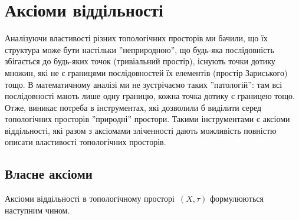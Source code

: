 \chapter{Аксіоми віддільності}

Аналізуючи властивості різних топологічних просторів ми бачили, що їх структура може бути настільки ''неприродною'', що будь-яка послідовність збігається до будь-яких точок (тривіальний простір), існують точки дотику множин, які не є границями послідовностей їх елементів (простір Зариського) тощо. В математичному аналізі ми не зустрічаємо таких ''патологій'': там всі послідовності мають лише одну границю, кожна точка дотику є границею тощо. Отже, виникає потреба в інструментах, які дозволили б виділити серед топологічних просторів ''природні'' простори. Такими інструментами є аксіоми віддільності, які разом з аксіомами зліченності дають можливість повністю описати властивості топологічних просторів.

\section{Власне аксіоми}

Аксіоми віддільності в топологічному просторі~$(X, \tau)$ формулюються наступним чином.

